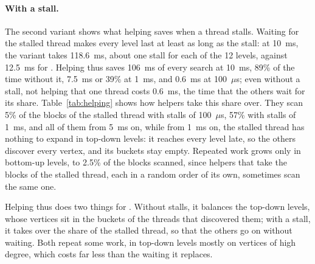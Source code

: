 \paragraph{With a stall.} The second variant shows what helping saves when a thread stalls. Waiting for the stalled thread makes every level last at least as long as the stall: at 10~ms, the variant takes 118.6~ms, about one stall for each of the 12 levels, against 12.5~ms for \wfdo. Helping thus saves 106~ms of every search at 10~ms, 89\% of the time without it, 7.5~ms or 39\% at 1~ms, and 0.6~ms at 100~$\mu$s; even without a stall, not helping that one thread costs 0.6~ms, the time that the others wait for its share. Table~\ref{tab:helping} shows how helpers take this share over. They scan 5\% of the blocks of the stalled thread with stalls of 100~$\mu$s, 57\% with stalls of 1~ms, and all of them from 5~ms on, while from 1~ms on, the stalled thread has nothing to expand in top-down levels: it reaches every level late, so the others discover every vertex, and its buckets stay empty. Repeated work grows only in bottom-up levels, to 2.5\% of the blocks scanned, since helpers that take the blocks of the stalled thread, each in a random order of its own, sometimes scan the same one.

Helping thus does two things for \wfdo. Without stalls, it balances the top-down levels, whose vertices sit in the buckets of the threads that discovered them; with a stall, it takes over the share of the stalled thread, so that the others go on without waiting. Both repeat some work, in top-down levels mostly on vertices of high degree, which costs far less than the waiting it replaces.
